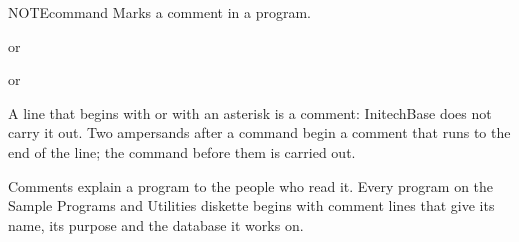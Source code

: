 \begin{XbaseEntry}{NOTE}{command}
\XAlso{*}{*}\XAlso{&&}{\&\&}%
Marks a comment in a program.
\Syntax
{}
\par or\par
{}
\par or\par
{}
\Usage
A line that begins with  or with an asterisk is a comment:
InitechBase does not carry it out.  Two ampersands after a command begin a
comment that runs to the end of the line; the command before them is carried
out.

Comments explain a program to the people who read it.  Every program on the
Sample Programs and Utilities diskette begins with comment lines that give its
name, its purpose and the database it works on.
\Examples
{}
\end{XbaseEntry}

